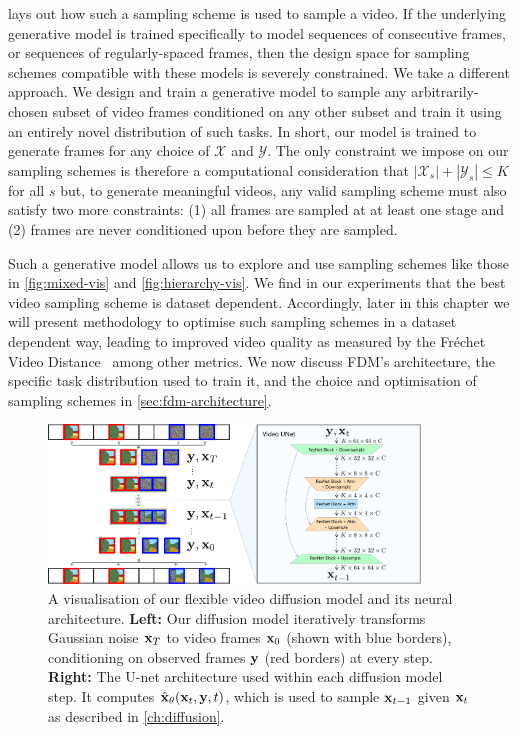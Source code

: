  lays out how such a sampling scheme is used to sample a video. If the underlying generative model is trained specifically to model sequences of consecutive frames, or sequences of regularly-spaced frames, then the design space for sampling schemes compatible with these models is severely constrained. We take a different approach.  We design and train a generative model to sample any arbitrarily-chosen subset of video frames conditioned on any other subset and train it using an entirely novel distribution of such tasks. In short, our model is trained to generate frames for any choice of $\mathcal{X}$ and $\mathcal{Y}$. The only constraint we impose on our sampling schemes is therefore a computational consideration that $|\mathcal{X}_s| + |\mathcal{Y}_s| \leq K$ for all $s$ but, to generate meaningful videos, any valid sampling scheme must also satisfy two more constraints: (1) all frames are sampled at at least one stage and (2) frames are never conditioned upon before they are sampled.

Such a generative model allows us to explore and use sampling schemes like those in \cref{fig:mixed-vis} and \cref{fig:hierarchy-vis}.  We find in our experiments that the best video sampling scheme is dataset dependent. Accordingly, later in this chapter we will present methodology to optimise such sampling schemes in a dataset dependent way, leading to improved video quality as measured by the Fréchet Video Distance~\cite{unterthiner2018towards} among other metrics. We now discuss FDM's architecture, the specific task distribution  used to train it, and the choice and optimisation of sampling schemes in \cref{sec:fdm-architecture}.

\begin{figure}[t]
    \centering
    \includegraphics[width=0.88\textwidth]{figs/fdm/video-architecture-v8.pdf}
    \caption{A visualisation of our flexible video diffusion model and its neural architecture. \textbf{Left:} Our diffusion model iteratively transforms Gaussian noise ${\mathbf{x}}_T$ to video frames ${\mathbf{x}}_0$ (shown with blue borders), conditioning on observed frames ${\mathbf{y}}$ (red borders) at every step. \textbf{Right:} The U-net architecture used within each diffusion model step. It computes $\hat{{\mathbf{x}}}_\theta({\mathbf{x}}_t, {\mathbf{y}}, t)$, which is used to sample ${\mathbf{x}}_{t-1}$ given ${\mathbf{x}}_t$ as described in \cref{ch:diffusion}.
    }
    \label{fig:architecture}
\end{figure}

